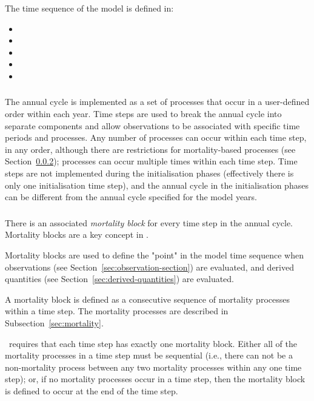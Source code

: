 The time sequence of the model is defined in:

\begin{itemize}
  \item {}
  \item {}
  \item {}
  \item {}
  \item {}
\end{itemize}

\subsubsection{}

The annual cycle is implemented as a set of processes that occur in a user-defined order within each year. Time steps are used to break the annual cycle into separate components and allow observations to be associated with specific time periods and processes. Any number of processes can occur within each time step, in any order, although there are restrictions for mortality-based processes (see Section~\ref{sec:mortality_block}); processes can occur multiple times within each time step. Time steps are not implemented during the initialisation phases (effectively there is only one initialisation time step), and the annual cycle in the initialisation phases can be different from the annual cycle specified for the model years.

\subsubsection{}\label{sec:mortality_block}

There is an associated \emph{mortality block} for every time step in the annual cycle. Mortality blocks are a key concept in \CNAME.

Mortality blocks are used to define the "point" in the model time sequence when observations (see Section~\ref{sec:observation-section}) are evaluated, and derived quantities (see Section~\ref{sec:derived-quantities}) are evaluated.

A mortality block is defined as a consecutive sequence of mortality processes within a time step. The mortality processes are described in Subsection~\ref{sec:mortality}.

\CNAME\ requires that each time step has exactly one mortality block. Either all of the mortality processes in a time step must be sequential (i.e., there can not be a non-mortality process between any two mortality processes within any one time step); or, if no mortality processes occur in a time step, then the mortality block is defined to occur at the end of the time step.

